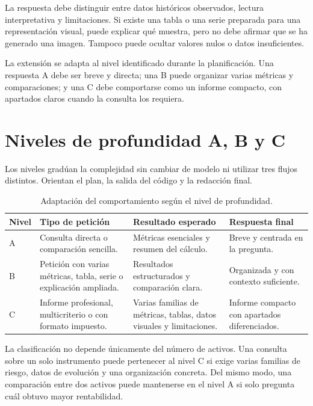 La respuesta debe distinguir entre datos históricos observados, lectura interpretativa y limitaciones. Si existe una tabla o una serie preparada para una representación visual, puede explicar qué muestra, pero no debe afirmar que se ha generado una imagen. Tampoco puede ocultar valores nulos o datos insuficientes.

La extensión se adapta al nivel identificado durante la planificación. Una respuesta A debe ser breve y directa; una B puede organizar varias métricas y comparaciones; y una C debe comportarse como un informe compacto, con apartados claros cuando la consulta los requiera.

\section{Niveles de profundidad A, B y C}

Los niveles gradúan la complejidad sin cambiar de modelo ni utilizar tres flujos distintos. Orientan el plan, la salida del código y la redacción final.

\begin{table}[H]
\centering
\small
\begin{tabularx}{\textwidth}{L{0.13\textwidth}L{0.28\textwidth}L{0.29\textwidth}Y}
\toprule
\textbf{Nivel} & \textbf{Tipo de petición} & \textbf{Resultado esperado} & \textbf{Respuesta final} \\
\midrule
A & Consulta directa o comparación sencilla. & Métricas esenciales y resumen del cálculo. & Breve y centrada en la pregunta. \\
B & Petición con varias métricas, tabla, serie o explicación ampliada. & Resultados estructurados y comparación clara. & Organizada y con contexto suficiente. \\
C & Informe profesional, multicriterio o con formato impuesto. & Varias familias de métricas, tablas, datos visuales y limitaciones. & Informe compacto con apartados diferenciados. \\
\bottomrule
\end{tabularx}
\caption{Adaptación del comportamiento según el nivel de profundidad.}
\label{tab:niveles_prompts}
\end{table}

La clasificación no depende únicamente del número de activos. Una consulta sobre un solo instrumento puede pertenecer al nivel C si exige varias familias de riesgo, datos de evolución y una organización concreta. Del mismo modo, una comparación entre dos activos puede mantenerse en el nivel A si solo pregunta cuál obtuvo mayor rentabilidad.

